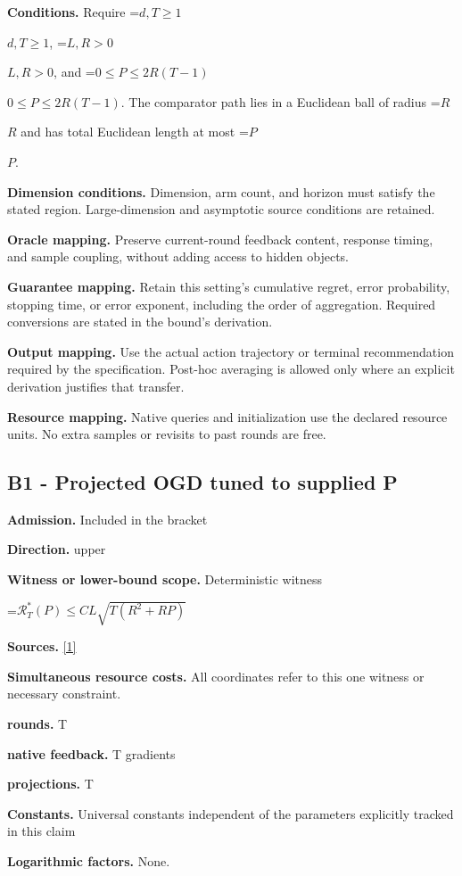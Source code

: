 \documentclass[10pt,a4paper]{article}
\newcommand{\AtlasMath}[1]{\par\begingroup\centering\setbox0=\hbox{$\displaystyle #1$}\ifdim\wd0>1.4\linewidth\typeout{ATLAS WIDE FORMULA: \the\wd0}\fi\ifdim\wd0>\linewidth\resizebox{\linewidth}{!}{\box0}\else\box0\fi\par\endgroup}
\newcommand{\AtlasInlineMath}[1]{\begingroup\setbox0=\hbox{$#1$}\ifdim\wd0>.4\linewidth\endgroup\AtlasMath{#1}\else\endgroup$#1$\fi}
\begin{document}
\textbf{Conditions.} Require \AtlasInlineMath{d,T\ge1}, \AtlasInlineMath{L,R>0}, and \AtlasInlineMath{0\le P\le2R(T-1)}. The comparator path lies in a Euclidean ball of radius \AtlasInlineMath{R} and has total Euclidean length at most \AtlasInlineMath{P}.

\textbf{Dimension conditions.} Dimension, arm count, and horizon must satisfy the stated region. Large-dimension and asymptotic source conditions are retained.

\textbf{Oracle mapping.} Preserve current-round feedback content, response timing, and sample coupling, without adding access to hidden objects.

\textbf{Guarantee mapping.} Retain this setting's cumulative regret, error probability, stopping time, or error exponent, including the order of aggregation. Required conversions are stated in the bound's derivation.

\textbf{Output mapping.} Use the actual action trajectory or terminal recommendation required by the specification. Post-hoc averaging is allowed only where an explicit derivation justifies that transfer.

\textbf{Resource mapping.} Native queries and initialization use the declared resource units. No extra samples or revisits to past rounds are free.

\subsection{B1 - Projected OGD tuned to supplied P}
\textbf{Admission.} Included in the bracket

\textbf{Direction.} upper

\textbf{Witness or lower-bound scope.} Deterministic witness

\AtlasMath{\mathcal{R}_T^*(P)\le C L\sqrt{T(R^2+RP)}}
\textbf{Sources.} \href{https://www.lamda.nju.edu.cn/lusy/pdf/zhang2018adaptive.pdf}{[1]}

\textbf{Simultaneous resource costs.} All coordinates refer to this one witness or necessary constraint.

\textbf{rounds.} T

\textbf{native feedback.} T gradients

\textbf{projections.} T

\textbf{Constants.} Universal constants independent of the parameters explicitly tracked in this claim

\textbf{Logarithmic factors.} None.
\end{document}
